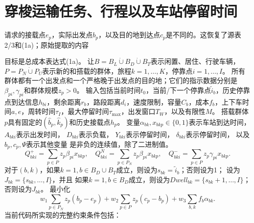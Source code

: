 \documentclass{article}
\begin{document}
\section*{穿梭运输任务、行程以及车站停留时间}
请求的接载点$e_p$，实际出发点$b_p$，以及目的地到达点$c_p$是不同的。这恢复了源表2/3和(1a)；原始提取的内容

目标是总成本表达式(1a)。
让$B=B_L\dot\cup B_D\dot\cup B_T$表示闲置、居住、行驶车辆，
$P=P_N\dot\cup P_U$表示新的和搭载的群体，旅程$k=1,\ldots,K$，停靠点$i=1,\ldots,I$。
所有群体都有一个出发点和一个严格晚于出发点的目的地；它们的指示数据分别是$\beta_{pi},\gamma_{pi}$和群体规模$z_p>0$。
输入包括当前时间$t_0$，当前/下一个停靠点$\tilde i_b$，历史停靠点到达信息$h_{bi}$，剩余距离$r_b$，路段距离$d_i$，速度限制，容量$C_b$，成本$f_b$，上下车时间$a,e$，周转时间$\tau_I$，最大停留时间$\tau_{\max}$，出发窗口$T_W$，以及有限性$M$。
搭载群体$p$具有固定的$(\hat b_p,\hat k_p)$和历史接载点$h_p$。
变量$\alpha_{bk},x_{bkp}\in\{0,1\}$表示车站到达时间，
$A_{bki}$表示出发时间，
$D_{bki}$表示负载，
$Y_{bki}$表示停留时间，
$\delta_{bki}$表示停留时间，
以及$b_p,c_p,\Psi$表示其他变量
是非负的连续值，除了二进制值。
\[
Q^+_{bki}=\sum_{p\in P}z_p\beta_{pi}x_{bkp},\quad
Q^N_{bki}=\sum_{p\in P_N}z_p\beta_{pi}x_{bkp},\quad
Q^-_{bki}=\sum_{p\in P}z_p\gamma_{pi}x_{bkp}.
\]
对于$(b,k)$，如果$k=1,b\in B_D\cup B_T$成立，则设为$s_{bk}=\tilde i_b$；否则设为1；
设为$J_{bk}=\{s_{bk},\ldots,I\}$，并且
如果$k=1,b\in B_D$成立，则设为$Dwell_{bk}=\{s_{bk}+1,\ldots,I\}$；否则设为$J_{bk}$。
最小化
\[
w_1\sum_{p\in P_N}z_p(b_p-e_p)+w_2\sum_{p\in P}z_p(c_p-b_p)
+w_3\sum_{b,k}f_b\alpha_{bk}.
\]
当前代码所实现的完整约束条件包括：
\end{document}
